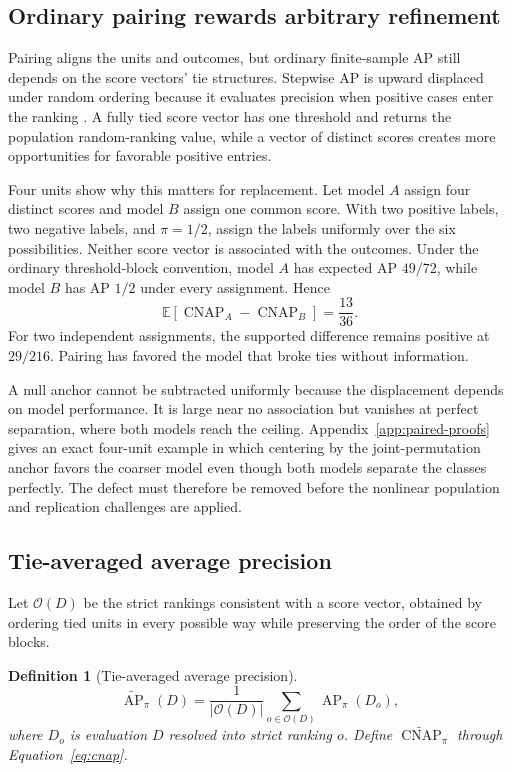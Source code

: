 \documentclass[11pt]{article}
\newcommand{\AP}{\operatorname{AP}}
\newcommand{\CNAP}{\operatorname{CNAP}}
\newcommand{\E}{\mathbb{E}}
\newcommand{\APta}{\widetilde{\AP}}
\newcommand{\CNAPta}{\widetilde{\CNAP}}
\newtheorem{definition}{Definition}
\theoremstyle{remark}
\begin{document}
\subsection{Ordinary pairing rewards arbitrary refinement}

Pairing aligns the units and outcomes, but ordinary finite-sample AP still depends on the score vectors' tie structures. Stepwise AP is upward displaced under random ordering because it evaluates precision when positive cases enter the ranking \cite{bestgen2015random}. A fully tied score vector has one threshold and returns the population random-ranking value, while a vector of distinct scores creates more opportunities for favorable positive entries.

Four units show why this matters for replacement. Let model $A$ assign four distinct scores and model $B$ assign one common score. With two positive labels, two negative labels, and $\pi=1/2$, assign the labels uniformly over the six possibilities. Neither score vector is associated with the outcomes. Under the ordinary threshold-block convention, model $A$ has expected AP $49/72$, while model $B$ has AP $1/2$ under every assignment. Hence
\[
\E[\CNAP_A-\CNAP_B]
=
\frac{13}{36}.
\]
For two independent assignments, the supported difference remains positive at $29/216$. Pairing has favored the model that broke ties without information.

A null anchor cannot be subtracted uniformly because the displacement depends on model performance. It is large near no association but vanishes at perfect separation, where both models reach the ceiling. Appendix~\ref{app:paired-proofs} gives an exact four-unit example in which centering by the joint-permutation anchor favors the coarser model even though both models separate the classes perfectly. The defect must therefore be removed before the nonlinear population and replication challenges are applied.

\subsection{Tie-averaged average precision}
\label{sec:tie-average}

Let $\mathcal O(D)$ be the strict rankings consistent with a score vector, obtained by ordering tied units in every possible way while preserving the order of the score blocks.

\begin{definition}[Tie-averaged average precision]
\begin{equation}
\APta_\pi(D)
=
\frac{1}{|\mathcal O(D)|}
\sum_{o\in\mathcal O(D)}
\AP_\pi(D_o),
\label{eq:tie-average}
\end{equation}
where $D_o$ is evaluation $D$ resolved into strict ranking $o$. Define $\CNAPta_\pi$ through Equation~\eqref{eq:cnap}.
\end{definition}
\end{document}
